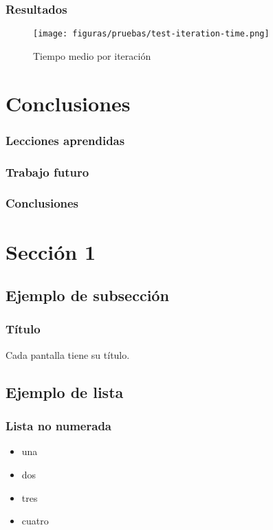 \documentclass{beamer}
\begin{document}
\begin{frame}[plain]
    \frametitle{Resultados}
    \begin{figure}[H]
        \centerline{\texttt{[image: figuras/pruebas/test-iteration-time.png]}}
        \caption{Tiempo medio por iteración}
        \label{fig:test-iteration-time}
    \end{figure}
\end{frame}

\section{Conclusiones}

\begin{frame}{}
    \frametitle{Lecciones aprendidas}
\end{frame}

\begin{frame}{}
    \frametitle{Trabajo futuro}
\end{frame}

\begin{frame}{}
    \frametitle{Conclusiones}
\end{frame}

\iffalse

\section{Sección 1} 
\subsection{Ejemplo de subsección}
\begin{frame}
\frametitle{Título} 
Cada pantalla tiene su título.
\end{frame}

\subsection{Ejemplo de lista}

\begin{frame}
\frametitle{Lista no numerada}
\begin{itemize}
\item una  
\item dos 
\item tres 
\item cuatro
\end{itemize} 
\end{frame}
\end{document}
